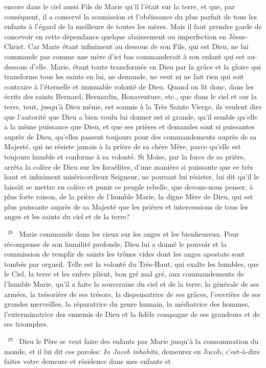 \documentclass[paper=a5,pagesize=pdftex,fontsize=15pt,headinclude=on,twoside=off]{scrbook}
\newcommand{\negphantom}[1]{\settowidth{\dimen0}{#1}\hspace*{-\dimen0}}
\newcommand{\versenb}[1]{\par \vspace{10pt}~\negphantom{~${}^{#1}$~}${}^{#1}$~}
\newcommand{\latin}[1]{\emph{#1}}
\begin{document}
encore dans le ciel aussi Fils de Marie qu'il l'était sur la terre, et que, par conséquent, il a conservé la soumission
et l'obéissance du plus parfait de tous les enfants à l'égard de la meilleure de toutes les mères. Mais il faut prendre
garde de concevoir en cette dépendance quelque abaissement ou imperfection en Jésus-Christ. Car Marie étant
infiniment au dessous de son Fils, qui est Dieu, ne lui commande pas comme une mère d'ici bas commanderait à
son enfant qui est au-dessous d'elle. Marie, étant toute transformée en Dieu par la grâce et la gloire qui transforme
tous les saints en lui, ne demande, ne veut ni ne fait rien qui soit contraire à l'éternelle et immuable volonté de
Dieu. Quand on lit donc, dans les écrits des saints Bernard, Bernardin, Bonaventure, etc., que dans le ciel et sur la
terre, tout, jusqu'à Dieu même, est soumis à la Très Sainte Vierge, ils veulent dire que l'autorité que Dieu a bien
voulu lui donner est si grande, qu'il semble qu'elle a la même puissance que Dieu, et que ses prières et demandes
sont si puissantes auprès de Dieu, qu'elles passent toujours pour des commandements auprès de sa Majesté, qui
ne résiste jamais à la prière de sa chère Mère, parce qu'elle est toujours humble et conforme à sa volonté.
Si Moïse, par la force de sa prière, arrêta la colère de Dieu sur les Israélites, d'une manière si puissante que ce
très haut et infiniment miséricordieux Seigneur, ne pouvant lui résister, lui dit qu'il le laissât se mettre en colère et
punir ce peuple rebelle, que devons-nous penser, à plus forte raison, de la prière de l'humble Marie, la digne Mère
de Dieu, qui est plus puissante auprès de sa Majesté que les prières et intercessions de tous les anges et les
saints du ciel et de la terre?
\versenb{28} Marie commande dans les cieux sur les anges et les bienheureux. Pour récompense de son humilité profonde,
Dieu lui a donné le pouvoir et la commission de remplir de saints les trônes vides dont les anges apostats sont
tombés par orgueil. Telle est la volonté du Très-Haut, qui exalte les humbles, que le Ciel, la terre et les enfers
plient, bon gré mal gré, aux commandements de l'humble Marie, qu'il a faite la souveraine du ciel et de la terre, la
générale de ses armées, la trésorière de ses trésors, la dispensatrice de ses grâces, l'ouvrière de ses grandes
merveilles, la réparatrice du genre humain, la médiatrice des hommes, l'exterminatrice des ennemis de Dieu et la
fidèle compagne de ses grandeurs et de ses triomphes.
\versenb{29} Dieu le Père se veut faire des enfants par Marie jusqu'à la consommation du monde, et il lui dit ces paroles: \latin{In Jacob inhabita}, demeurez en Jacob, c'est-à-dire faites votre demeure et résidence dans mes enfants et
\end{document}
